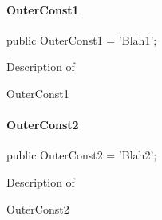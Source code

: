 \documentclass{report}
\begin{document}
\paragraph*{OuterConst1}\hspace*{\fill}

\begin{list}{}{
\setlength{\itemindent}{0cm}
\setlength{\listparindent}{0cm}
\setlength{\leftmargin}{\evensidemargin}
\addtolength{\leftmargin}{\tmplength}
\settowidth{\labelsep}{X}
\addtolength{\leftmargin}{\labelsep}
\setlength{\labelwidth}{\tmplength}
}
\begin{flushleft}
\item[\textbf{Declaration}\hfill]
\begin{ttfamily}
public OuterConst1 = 'Blah1';\end{ttfamily}


\end{flushleft}
\par
\item[\textbf{Description}]
Description of \begin{ttfamily}OuterConst1\end{ttfamily}

\end{list}
\paragraph*{OuterConst2}\hspace*{\fill}

\begin{list}{}{
\setlength{\itemindent}{0cm}
\setlength{\listparindent}{0cm}
\setlength{\leftmargin}{\evensidemargin}
\addtolength{\leftmargin}{\tmplength}
\settowidth{\labelsep}{X}
\addtolength{\leftmargin}{\labelsep}
\setlength{\labelwidth}{\tmplength}
}
\begin{flushleft}
\item[\textbf{Declaration}\hfill]
\begin{ttfamily}
public OuterConst2 = 'Blah2';\end{ttfamily}


\end{flushleft}
\par
\item[\textbf{Description}]
Description of \begin{ttfamily}OuterConst2\end{ttfamily}

\end{list}
\end{document}
